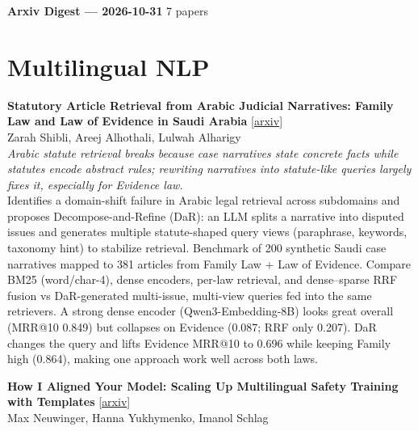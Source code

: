 \documentclass[12pt,letterpaper]{article}
\begin{document}
{\footnotesize\textbf{Arxiv Digest --- 2026-10-31} \hfill 7 papers}

\smallskip

\section*{Multilingual NLP}

{\small\textbf{Statutory Article Retrieval from Arabic Judicial Narratives: Family Law and Law of Evidence in Saudi Arabia}} {\scriptsize[\href{https://arxiv.org/abs/2610.38336}{arxiv}]}\\
{\scriptsize Zarah Shibli, Areej Alhothali, Lulwah Alharigy}\\

{\small\textit{Arabic statute retrieval breaks because case narratives state concrete facts while statutes encode abstract rules; rewriting narratives into statute-like queries largely fixes it, especially for Evidence law.}}\\[1pt]
{\footnotesize Identifies a domain-shift failure in Arabic legal retrieval across subdomains and proposes Decompose-and-Refine (DaR): an LLM splits a narrative into disputed issues and generates multiple statute-shaped query views (paraphrase, keywords, taxonomy hint) to stabilize retrieval. Benchmark of 200 synthetic Saudi case narratives mapped to 381 articles from Family Law + Law of Evidence. Compare BM25 (word/char-4), dense encoders, per-law retrieval, and dense--sparse RRF fusion vs DaR-generated multi-issue, multi-view queries fed into the same retrievers. A strong dense encoder (Qwen3-Embedding-8B) looks great overall (MRR@10 0.849) but collapses on Evidence (0.087; RRF only 0.207). DaR changes the query and lifts Evidence MRR@10 to 0.696 while keeping Family high (0.864), making one approach work well across both laws.}

\medskip

{\small\textbf{How I Aligned Your Model: Scaling Up Multilingual Safety Training with Templates}} {\scriptsize[\href{https://arxiv.org/abs/2610.40516}{arxiv}]}\\
{\scriptsize Max Neuwinger, Hanna Yukhymenko, Imanol Schlag}\\
\end{document}
